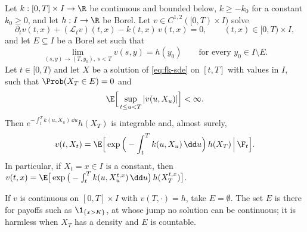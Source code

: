 \begin{theorem}\label{thm:fk-feynman-kac}
Let $k:[0,T]\times I\to\R$ be continuous and bounded below, $k\ge-k_0$ for a constant
$k_0\ge0$, and let $h:I\to\R$ be Borel. Let $v\in C^{1,2}([0,T)\times I)$ solve
\begin{equation}\label{eq:fk-pde}
  \partial_tv(t,x)+(\mathcal L_tv)(t,x)-k(t,x)\,v(t,x)=0,\qquad(t,x)\in[0,T)\times I,
\end{equation}
and let $E\subseteq I$ be a Borel set such that
\begin{equation}\label{eq:fk-terminal}
  \lim_{(s,y)\to(T,y_0),\ s<T}v(s,y)=h(y_0)\qquad\text{for every }y_0\in I\setminus E .
\end{equation}
Let $t\in[0,T)$ and let $X$ be a solution of \eqref{eq:fk-sde} on $[t,T]$ with values in $I$, such
that $\Prob(X_T\in E)=0$ and
\begin{equation}\label{eq:fk-integrability}
  \E\Big[\sup_{t\le u<T}|v(u,X_u)|\Big]<\infty .
\end{equation}
Then $e^{-\int_t^Tk(u,X_u)\,\dd u}h(X_T)$ is integrable and, almost surely,
\begin{equation}\label{eq:fk-formula}
  v(t,X_t)=\E\Big[\exp\Big(-\int_t^Tk(u,X_u)\,\dd u\Big)\,h(X_T)\,\Big|\,\F_t\Big].
\end{equation}
In particular, if $X_t=x\in I$ is a constant, then
$v(t,x)=\E\big[\exp\big(-\int_t^Tk(u,X^{t,x}_u)\,\dd u\big)\,h(X^{t,x}_T)\big]$.
\end{theorem}

If $v$ is continuous on $[0,T]\times I$ with $v(T,\cdot)=h$, take $E=\emptyset$. The set $E$ is
there for payoffs such as $\1_{\{x>K\}}$, at whose jump no solution can be continuous; it is
harmless when $X_T$ has a density and $E$ is countable.

